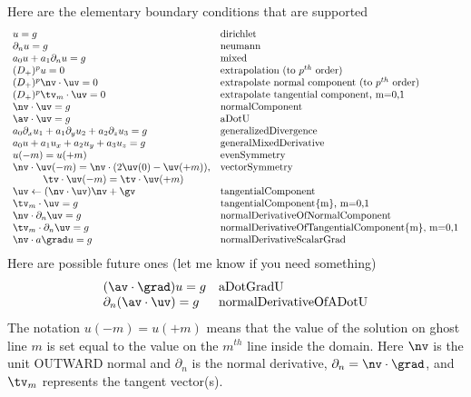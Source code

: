 Here are the elementary boundary conditions that are supported 
\[
\begin{array}{ll}
    u = g &  \mbox{dirichlet} \\
    \partial_n u  = g &  \mbox{neumann} \\
    a_0 u + a_1 \partial_n u = g & \mbox{mixed} \\
    (D_+)^p u = 0 &  \mbox{extrapolation (to $p^{th}$ order)}  \\
    (D_+)^p \nv\cdot \uv = 0 &  \mbox{extrapolate normal component (to $p^{th}$ order)}  \\
    (D_+)^p \tv_m\cdot \uv = 0 &  \mbox{extrapolate tangential component, m=0,1}  \\
    \nv\cdot \uv = g & \mbox{normalComponent} \\
    \av\cdot\uv = g &  \mbox{aDotU}  \\
    a_0 \partial_x u_1 + a_1 \partial_y u_2 +a_2 \partial_z u_3 = g &  \mbox{generalizedDivergence}    \\
    a_0 u + a_1 u_x + a_2 u_y + a_3 u_z = g & \mbox{generalMixedDerivative}  \\
    u(-m) = u(+m) & \mbox{evenSymmetry} \\
    \nv\cdot\uv(-m)=\nv\cdot(2\uv(0)-\uv(+m)),  & \mbox{vectorSymmetry} \\
          \qquad\quad  \tv\cdot\uv(-m)=\tv\cdot\uv(+m) &                       \\
    \uv \leftarrow (\nv\cdot\uv)\nv + \gv & \mbox{tangentialComponent} \\
    \tv_m\cdot\uv = g &  \mbox{tangentialComponent\{m\}, m=0,1} \\
    \nv\cdot \partial_n \uv = g &  \mbox{normalDerivativeOfNormalComponent} \\
    \tv_m\cdot \partial_n \uv = g &  \mbox{normalDerivativeOfTangentialComponent\{m\}, m=0,1} \\
    \nv\cdot{ a \grad u} = g & \mbox{normalDerivativeScalarGrad} 
\end{array}
\]      
Here are possible future ones (let me know if you need something)
\[
\begin{array}{ll}
    (\av\cdot\grad) u = g & \mbox{aDotGradU} \\
    \partial_n (\av\cdot\uv) = g &  \mbox{normalDerivativeOfADotU} \\
\end{array}
\]      
The notation $u(-m) = u(+m)$ means that the value of the solution on ghost line $m$
is set equal to the value on the $m^{th}$ line inside the domain.
Here $\nv$ is the unit OUTWARD normal and $\partial_n$ is the normal derivative, $\partial_n=\nv\cdot\grad$,
and $\tv_m$ represents the tangent vector(s). 

